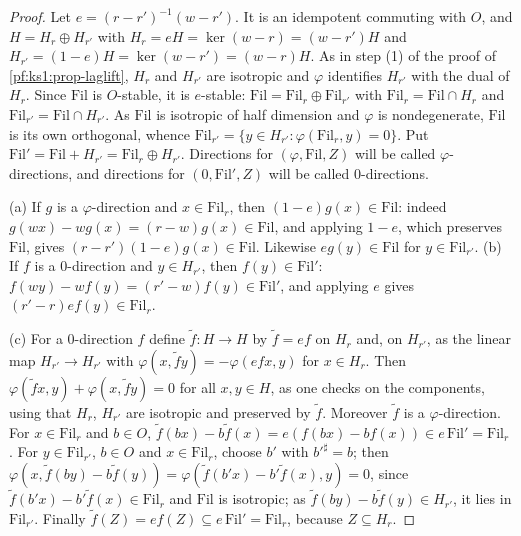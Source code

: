 \begin{proof}
Let $e=(r-r')^{-1}(w-r')$. It is an idempotent commuting with $O$, and $H=H_r\oplus H_{r'}$ with $H_r=eH=\ker(w-r)=(w-r')H$ and
$H_{r'}=(1-e)H=\ker(w-r')=(w-r)H$. As in step (1) of the proof of \cref{pf:ks1:prop-laglift}, $H_r$ and $H_{r'}$ are isotropic and $\varphi$
identifies $H_{r'}$ with the dual of $H_r$. Since $\mathrm{Fil}$ is $O$-stable, it is $e$-stable: $\mathrm{Fil}=\mathrm{Fil}_r\oplus\mathrm{Fil}_{r'}$
with $\mathrm{Fil}_r=\mathrm{Fil}\cap H_r$ and $\mathrm{Fil}_{r'}=\mathrm{Fil}\cap H_{r'}$. As $\mathrm{Fil}$ is isotropic of half dimension and
$\varphi$ is nondegenerate, $\mathrm{Fil}$ is its own orthogonal, whence $\mathrm{Fil}_{r'}=\{y\in H_{r'}:\varphi(\mathrm{Fil}_r,y)=0\}$. Put
$\mathrm{Fil}'=\mathrm{Fil}+H_{r'}=\mathrm{Fil}_r\oplus H_{r'}$. Directions for $(\varphi,\mathrm{Fil},Z)$ will be called $\varphi$-directions, and
directions for $(0,\mathrm{Fil}',Z)$ will be called $0$-directions.

(a) If $g$ is a $\varphi$-direction and $x\in\mathrm{Fil}_r$, then $(1-e)g(x)\in\mathrm{Fil}$: indeed $g(wx)-wg(x)=(r-w)g(x)\in\mathrm{Fil}$, and
applying $1-e$, which preserves $\mathrm{Fil}$, gives $(r-r')(1-e)g(x)\in\mathrm{Fil}$. Likewise $eg(y)\in\mathrm{Fil}$ for $y\in\mathrm{Fil}_{r'}$.
(b) If $f$ is a $0$-direction and $y\in H_{r'}$, then $f(y)\in\mathrm{Fil}'$: $f(wy)-wf(y)=(r'-w)f(y)\in\mathrm{Fil}'$, and applying $e$ gives
$(r'-r)ef(y)\in\mathrm{Fil}_r$.

(c) For a $0$-direction $f$ define $\tilde f:H\to H$ by $\tilde f=ef$ on $H_r$ and, on $H_{r'}$, as the linear map $H_{r'}\to H_{r'}$ with
$\varphi(x,\tilde fy)=-\varphi(efx,y)$ for $x\in H_r$. Then $\varphi(\tilde fx,y)+\varphi(x,\tilde fy)=0$ for all $x,y\in H$, as one checks on the
components, using that $H_r$, $H_{r'}$ are isotropic and preserved by $\tilde f$. Moreover $\tilde f$ is a $\varphi$-direction. For $x\in\mathrm{Fil}_r$
and $b\in O$, $\tilde f(bx)-b\tilde f(x)=e(f(bx)-bf(x))\in e\,\mathrm{Fil}'=\mathrm{Fil}_r$. For $y\in\mathrm{Fil}_{r'}$, $b\in O$ and $x\in\mathrm{Fil}_r$,
choose $b'$ with $b'^\sharp=b$; then $\varphi(x,\tilde f(by)-b\tilde f(y))=\varphi(\tilde f(b'x)-b'\tilde f(x),y)=0$, since
$\tilde f(b'x)-b'\tilde f(x)\in\mathrm{Fil}_r$ and $\mathrm{Fil}$ is isotropic; as $\tilde f(by)-b\tilde f(y)\in H_{r'}$, it lies in $\mathrm{Fil}_{r'}$.
Finally $\tilde f(Z)=ef(Z)\subseteq e\,\mathrm{Fil}'=\mathrm{Fil}_r$, because $Z\subseteq H_r$.


\end{proof}
